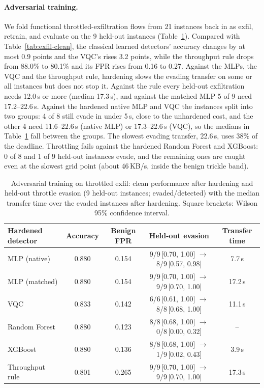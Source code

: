 \documentclass[preprint,12pt]{elsarticle}
\begin{document}
\paragraph{Adversarial training.} We fold functional throttled-exfiltration flows from 21 instances
back in as exfil, retrain, and evaluate on the 9 held-out instances (Table~\ref{tab:exfil-hardened}).
Compared with Table~\ref{tab:exfil-clean}, the classical learned detectors' accuracy changes by at most
0.9 points and the VQC's rises 3.2 points, while the throughput rule drops from 88.0\% to 80.1\% and its FPR rises from 0.16
to 0.27. Against the MLPs, the VQC and the throughput rule, hardening slows the evading transfer on some
or all instances but does not stop it. Against the rule every held-out exfiltration needs 12.0\,s or
more (median 17.3\,s), and against the matched MLP 5 of 9 need 17.2--22.6\,s. Against the hardened
native MLP and VQC the instances split into two groups: 4 of 8 still evade in under 5\,s, close to the
unhardened cost, and the other 4 need 11.6--22.6\,s (native MLP) or 17.3--22.6\,s (VQC), so the medians in
Table~\ref{tab:exfil-hardened} fall between the groups. The slowest evading transfer, 22.6\,s, uses 38\%
of the deadline. Throttling fails against the hardened Random Forest and XGBoost: 0 of 8 and 1 of 9
held-out instances evade, and the remaining ones are caught even at the slowest grid point (about
46\,KB/s, inside the benign trickle band).

\begin{table}[htbp]
\centering
\caption{Adversarial training on throttled exfil: clean performance after hardening and held-out
throttle evasion (9 held-out instances; evaded/detected) with the median transfer time over the evaded
instances after hardening. Square brackets: Wilson 95\% confidence interval.}
\label{tab:exfil-hardened}
\setlength{\tabcolsep}{3pt}\footnotesize
\begin{tabular}{lcccc}
\toprule
Hardened detector & Accuracy & Benign FPR & Held-out evasion & Transfer time \\
\midrule
MLP (native)    & 0.880 & 0.154 & 9/9\,{\scriptsize[0.70, 1.00]} $\rightarrow$ 8/9\,{\scriptsize[0.57, 0.98]} & 7.7\,s \\
MLP (matched)   & 0.880 & 0.154 & 9/9\,{\scriptsize[0.70, 1.00]} $\rightarrow$ 9/9\,{\scriptsize[0.70, 1.00]} & 17.2\,s \\
VQC             & 0.833 & 0.142 & 6/6\,{\scriptsize[0.61, 1.00]} $\rightarrow$ 8/8\,{\scriptsize[0.68, 1.00]} & 11.1\,s \\
Random Forest   & 0.880 & 0.123 & 8/8\,{\scriptsize[0.68, 1.00]} $\rightarrow$ 0/8\,{\scriptsize[0.00, 0.32]} & -- \\
XGBoost         & 0.880 & 0.136 & 8/8\,{\scriptsize[0.68, 1.00]} $\rightarrow$ 1/9\,{\scriptsize[0.02, 0.43]} & 3.9\,s \\
Throughput rule & 0.801 & 0.265 & 9/9\,{\scriptsize[0.70, 1.00]} $\rightarrow$ 9/9\,{\scriptsize[0.70, 1.00]} & 17.3\,s \\
\bottomrule
\end{tabular}
\end{table}
\end{document}
